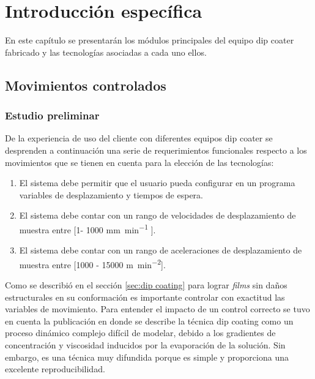 
\chapter{Introducción específica} %

\label{Chapter2} %

En este capítulo se presentarán los módulos principales del equipo dip coater fabricado y las tecnologías asociadas a cada uno ellos. 

\section{Movimientos controlados}
\subsection{Estudio preliminar}

De la experiencia de uso del cliente con diferentes equipos dip coater se desprenden a continuación una serie de requerimientos funcionales respecto a los movimientos que se tienen en cuenta para la elección de las tecnologías: 

\begin{enumerate}
			\item El sistema debe permitir que el usuario pueda configurar en un programa variables de desplazamiento y tiempos de espera.
			\item El sistema debe contar con un rango de velocidades de desplazamiento de muestra entre [1- 1000 \si{\milli\meter\per\minute} ]. 
			\item El sistema debe contar con un rango de aceleraciones de desplazamiento de muestra entre [1000 - 15000 \si{\meter\per\square\minute}].
		
\end{enumerate}
	
Como se describió en el sección \ref{sec:dip coating} para lograr \textit{films} sin daños estructurales en su conformación es importante controlar con exactitud las variables de movimiento. Para entender el impacto de un control correcto se tuvo en cuenta la publicación \cite{paper_galo}  en donde se describe la técnica dip coating como un proceso dinámico complejo difícil de modelar, debido a los gradientes de concentración y viscosidad inducidos por la evaporación de la solución. Sin embargo, es una técnica muy difundida porque es simple y proporciona una excelente reproducibilidad. 

